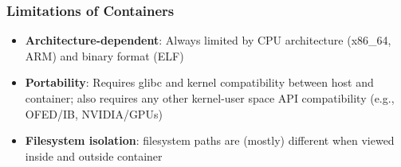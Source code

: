 \documentclass{beamer}
\begin{document}
\begin{frame}
   \frametitle{Limitations of Containers}
   \begin{itemize}
      \setlength\itemsep{1.0em}
      \item \textbf{Architecture-dependent}: Always limited by CPU 
         architecture (x86\_64, ARM) and binary format (ELF)
      \item \textbf{Portability}: Requires glibc and kernel 
         compatibility between host and container; also requires any 
         other kernel-user space API compatibility (e.g., OFED/IB, 
            NVIDIA/GPUs)
      \item \textbf{Filesystem isolation}: filesystem paths are (mostly) 
         different when viewed inside and outside container
   \end{itemize}
\end{frame}
\end{document}
